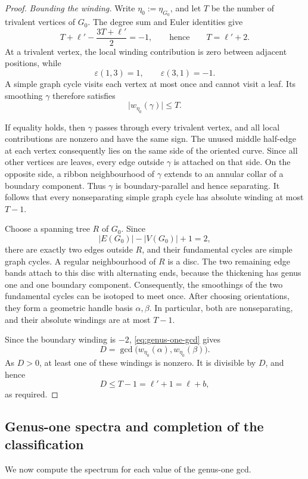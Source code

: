 \documentclass[11pt]{amsart}
\theoremstyle{definition}
\theoremstyle{plain}
\theoremstyle{definition}
\theoremstyle{definition}
\begin{document}
\begin{proof}
\smallskip
\noindent\emph{Bounding the winding.}
Write $\eta_0:=\eta_{G_0}$, and let $T$ be the number
of trivalent vertices of $G_0$.
The degree sum and Euler identities give
\[
 T+\ell'-\frac{3T+\ell'}2=-1,
 \qquad\text{hence}\qquad
 T=\ell'+2.
\]
At a trivalent vertex, the local winding contribution
is zero between adjacent positions, while
\[
 \varepsilon(1,3)=1,
 \qquad
 \varepsilon(3,1)=-1.
\]
A simple graph cycle visits each vertex at most once
and cannot visit a leaf.
Its smoothing $\gamma$ therefore satisfies
\[
 \bigl|w_{\eta_0}(\gamma)\bigr|\leq T.
\]

If equality holds, then $\gamma$ passes through every
trivalent vertex, and all local contributions are
nonzero and have the same sign.
The unused middle half-edge at each vertex consequently
lies on the same side of the oriented curve.
Since all other vertices are leaves, every edge outside
$\gamma$ is attached on that side.
On the opposite side, a ribbon neighbourhood of
$\gamma$ extends to an annular collar of a boundary
component.
Thus $\gamma$ is boundary-parallel and hence separating.
It follows that every nonseparating simple graph cycle
has absolute winding at most $T-1$.

Choose a spanning tree $R$ of $G_0$.
Since
\[
 |E(G_0)|-|V(G_0)|+1=2,
\]
there are exactly two edges outside $R$, and their
fundamental cycles are simple graph cycles.
A regular neighbourhood of $R$ is a disc.
The two remaining edge bands attach to this disc
with alternating ends, because the thickening has
genus one and one boundary component.
Consequently, the smoothings of the two fundamental
cycles can be isotoped to meet once.
After choosing orientations, they form a geometric
handle basis $\alpha,\beta$.
In particular, both are nonseparating, and their
absolute windings are at most $T-1$.

Since the boundary winding is $-2$,
\eqref{eq:genus-one-gcd} gives
\[
 D=\gcd\bigl(
     w_{\eta_0}(\alpha),w_{\eta_0}(\beta)
    \bigr).
\]
As $D>0$, at least one of these windings is nonzero.
It is divisible by $D$, and hence
\[
 D\leq T-1=\ell'+1=\ell+b,
\]
as required.
\end{proof}
\subsection{Genus-one spectra and completion of the classification}
\label{subsec:classification-genus-one}

We now compute the spectrum for each value of the genus-one gcd.
\end{document}
